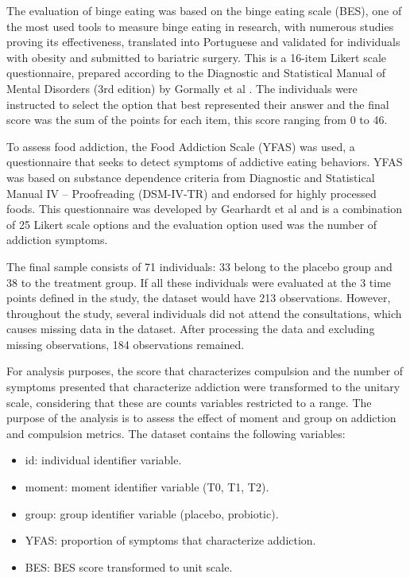 \documentclass[Review,sagev,times, doublespace]{sagej}
\begin{document}
The evaluation of binge eating was based on the binge eating scale (BES), one of the most used tools to measure binge eating in research, with numerous studies proving its effectiveness, translated into Portuguese and validated for individuals with obesity and submitted to bariatric surgery. This is a 16-item Likert scale questionnaire, prepared according to the Diagnostic and Statistical Manual of Mental Disorders (3rd edition) \cite{spitzer1980diagnostic} by Gormally et al \cite{gormally1982assessment}. The individuals were instructed to select the option that best represented their answer and the final score was the sum of the points for each item, this score ranging from 0 to 46.

To assess food addiction, the Food Addiction Scale (YFAS) was used, a questionnaire that seeks to detect symptoms of addictive eating behaviors. YFAS was based on substance dependence criteria from Diagnostic and Statistical Manual IV – Proofreading (DSM-IV-TR) \cite{segal2010diagnostic} and endorsed for highly processed foods. This questionnaire was developed by Gearhardt et al \cite{gearhardt2009preliminary} and is a combination of 25 Likert scale options and the evaluation option used was the number of addiction symptoms.


The final sample consists of 71 individuals: 33 belong to the placebo group and 38 to the treatment group. If all these individuals were evaluated at the 3 time points defined in the study, the dataset would have 213 observations. However, throughout the study, several individuals did not attend the consultations, which causes missing data in the dataset. After processing the data and excluding missing observations, 184 observations remained.


For analysis purposes, the score that characterizes compulsion and the number of symptoms presented that characterize addiction were transformed to the unitary scale, considering that these are counts variables restricted to a range. The purpose of the analysis is to assess the effect of moment and group on addiction and compulsion metrics. The dataset contains the following variables:

\begin{itemize}
  \item id: individual identifier variable.
  \item moment: moment identifier variable (T0, T1, T2).
  \item group: group identifier variable (placebo, probiotic).
  \item YFAS: proportion of symptoms that characterize addiction.
  \item BES: BES score transformed to unit scale.
\end{itemize}
\end{document}

